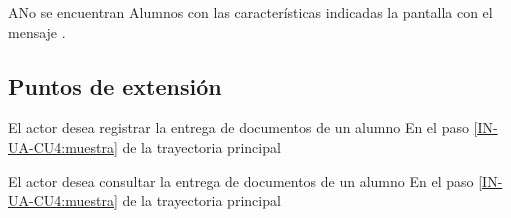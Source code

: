 
\begin{UCtrayectoriaA}{A}{No se encuentran Alumnos con las características indicadas}
	\UCpaso la pantalla  con el mensaje .
\end{UCtrayectoriaA}

\subsection{Puntos de extensión}
{El actor desea registrar la entrega de documentos de un alumno}
{En el paso \ref{IN-UA-CU4:muestra} de la trayectoria principal}
{}

{El actor desea consultar la entrega de documentos de un alumno}
{En el paso \ref{IN-UA-CU4:muestra} de la trayectoria principal}
{}

